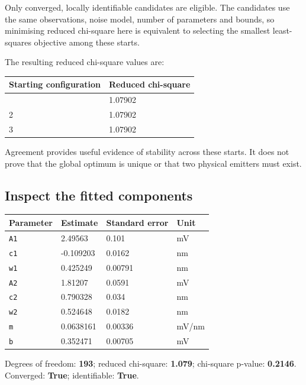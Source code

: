 \documentclass[
  british,
  10pt,
  a4paper,
]{article}
\newcommand{\passthrough}[1]{#1}
\begin{document}
Only converged, locally identifiable candidates are eligible. The
candidates use the same observations, noise model, number of parameters
and bounds, so minimising reduced chi-square here is equivalent to
selecting the smallest least-squares objective among these starts.

The resulting reduced chi-square values are:

\begin{longtable}[]{@{}ll@{}}
\toprule\noalign{}
Starting configuration & Reduced chi-square \\
\midrule\noalign{}
\endhead
\bottomrule\noalign{}
\endlastfoot
1 & 1.07902 \\
2 & 1.07902 \\
3 & 1.07902 \\
\end{longtable}

Agreement provides useful evidence of stability across these starts. It
does not prove that the global optimum is unique or that two physical
emitters must exist.


\subsection{Inspect the fitted
components}\label{inspect-the-fitted-components}

\begin{longtable}[]{@{}llll@{}}
\toprule\noalign{}
Parameter & Estimate & Standard error & Unit \\
\midrule\noalign{}
\endhead
\bottomrule\noalign{}
\endlastfoot
\passthrough{\lstinline!A1!} & 2.49563 & 0.101 & mV \\
\passthrough{\lstinline!c1!} & -0.109203 & 0.0162 & nm \\
\passthrough{\lstinline!w1!} & 0.425249 & 0.00791 & nm \\
\passthrough{\lstinline!A2!} & 1.81207 & 0.0591 & mV \\
\passthrough{\lstinline!c2!} & 0.790328 & 0.034 & nm \\
\passthrough{\lstinline!w2!} & 0.524648 & 0.0182 & nm \\
\passthrough{\lstinline!m!} & 0.0638161 & 0.00336 & mV/nm \\
\passthrough{\lstinline!b!} & 0.352471 & 0.00705 & mV \\
\end{longtable}

Degrees of freedom: \textbf{193}; reduced chi-square: \textbf{1.079};
chi-square p-value: \textbf{0.2146}. Converged: \textbf{True};
identifiable: \textbf{True}.
\end{document}
